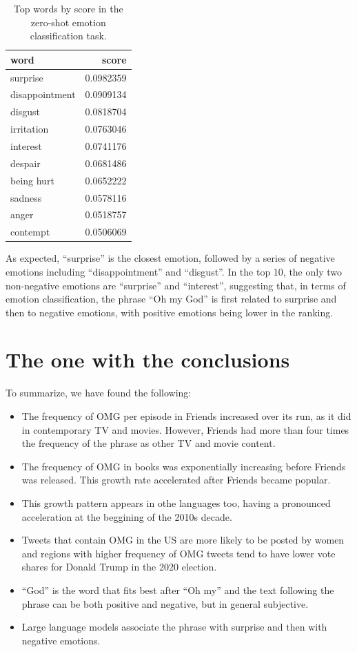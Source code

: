 \documentclass[]{article}
\begin{document}
\begin{table}[h]
\centering
\begin{tabular}{|l|r|}
\hline
word & score\\
\hline
surprise & 0.0982359\\
\hline
disappointment & 0.0909134\\
\hline
disgust & 0.0818704\\
\hline
irritation & 0.0763046\\
\hline
interest & 0.0741176\\
\hline
despair & 0.0681486\\
\hline
being hurt & 0.0652222\\
\hline
sadness & 0.0578116\\
\hline
anger & 0.0518757\\
\hline
contempt & 0.0506069\\
\hline
\end{tabular}
\caption{Top words by score in the zero-shot emotion classification task.}
\end{table}

As expected, ``surprise'' is the closest emotion, followed by a series of negative emotions including ``disappointment'' and ``disgust''. In the top 10, the only two non-negative emotions are ``surprise'' and ``interest'', suggesting that, in terms of emotion classification, the phrase ``Oh my God'' is first related to surprise and then to negative emotions, with positive emotions being lower in the ranking.

\hypertarget{the-one-with-the-conclusions}{%
\section{The one with the conclusions}\label{the-one-with-the-conclusions}}

To summarize, we have found the following:

\begin{itemize}
\item
  The frequency of OMG per episode in Friends increased over its run, as it did in contemporary TV and movies. However, Friends had more than four times the frequency of the phrase as other TV and movie content.
\item
  The frequency of OMG in books was exponentially increasing before Friends was released. This growth rate accelerated after Friends became popular.
\item
  This growth pattern appears in othe languages too, having a pronounced acceleration at the beggining of the 2010s decade.
\item
  Tweets that contain OMG in the US are more likely to be posted by women and regions with higher frequency of OMG tweets tend to have lower vote shares for Donald Trump in the 2020 election.
\item
  ``God'' is the word that fits best after ``Oh my'' and the text following the phrase can be both positive and negative, but in general subjective.
\item
  Large language models associate the phrase with surprise and then with negative emotions.
\end{itemize}
\end{document}
